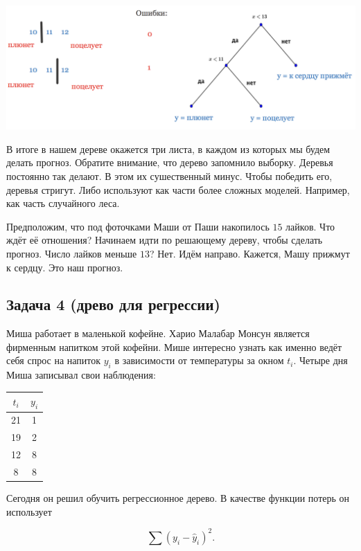 \documentclass[12pt, a4paper, oneside]{article}
\begin{document}
{	\begin{center}
		\includegraphics[scale=0.28]{class_tree_2.png}
	\end{center} 	
	
	В итоге в нашем дереве окажется три листа, в каждом из которых мы будем делать прогноз. Обратите внимание, что дерево запомнило выборку.  Деревья постоянно так делают. В этом их сушественный минус. Чтобы победить его, деревья стригут. Либо используют как части более сложных моделей. Например, как часть случайного леса. 
	
	Предположим, что под фоточками Маши от Паши накопилось $15$ лайков. Что ждёт её отношения? Начинаем идти по решающему дереву, чтобы сделать прогноз. Число лайков меньше $13$? Нет. Идём направо. Кажется, Машу прижмут к сердцу. Это наш прогноз.  	
}


\subsection*{Задача 4 (древо для регрессии)}

Миша работает в маленькой кофейне. Харио Малабар Монсун является фирменным напитком этой кофейни. Мише интересно узнать как именно ведёт себя спрос на напиток $y_i$ в зависимости от температуры за окном $t_i$. Четыре дня Миша записывал свои наблюдения: 

\begin{center}
	\begin{tabular}{c|c}
		\hline
		$t_i$ & $y_i$ \\
		\hline
		21 &  1 \\
		19 & 2 \\
		12 & 8 \\
		8 & 8 \\
	\end{tabular}
\end{center}

Сегодня он решил обучить регрессионное дерево. В качестве функции потерь он использует 

\[ \sum (y_i - \hat y_i)^2. \]
\end{document}
